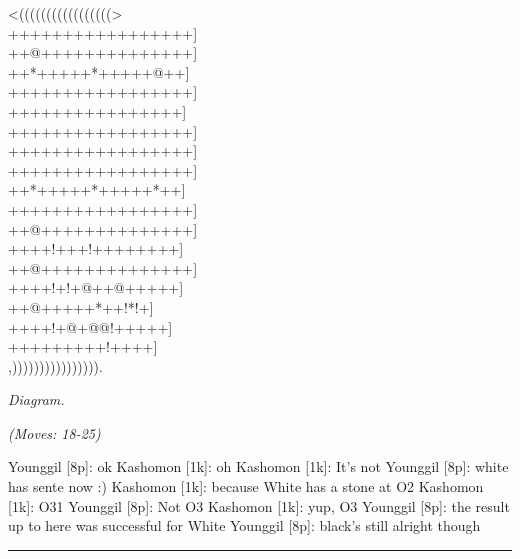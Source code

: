 \documentclass[letterpaper,12pt]{memoir}
\newcounter{GoFigure}[part]
\newcommand{\gofigure}{%
 \stepcounter{GoFigure}
 \centerline{\textit{Diagram.\thinspace\arabic{GoFigure}}}
}
\newcommand{\subtext}[1]{\centerline{\textit{#1}}}
\begin{document}
\begin{minipage}[t]{0.5\textwidth}
{\gnos
<(((((((((((((((((>\\
+++++++++++++++++]\\
++@++++++++++++++]\\
++*+++++*+++++@++]\\
+++++++++++++++++]\\
++++++++++++++++]\\
+++++++++++++++++]\\
+++++++++++++++++]\\
+++++++++++++++++]\\
++*+++++*+++++*++]\\
+++++++++++++++++]\\
++@++++++++++++++]\\
++++!+++!++++++++]\\
++@++++++++++++++]\\
++++!+!+@++@+++++]\\
++@+++++*++!*!+]\\
++++!+@+@@!+++++]\\
+++++++++!++++]\\
,)))))))))))))))).\\
}
\gofigure

\subtext{(Moves: 18-25)}
\end{minipage}
\begin{minipage}[t]{0.5\textwidth}
\setlength{\parskip}{0.5em}
Younggil [8p]: ok
Kashomon [1k]: oh
Kashomon [1k]: It's not
Younggil [8p]: white has sente now :)
Kashomon [1k]: because White has a stone at O2
Kashomon [1k]: O31
Younggil [8p]: Not O3
Kashomon [1k]: yup, O3
Younggil [8p]: the result up to here was successful for White
Younggil [8p]: black's still alright though


\end{minipage}
\vfill

\rule{\textwidth}{0.5pt}
\end{document}
